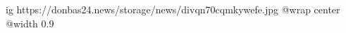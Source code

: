  
 
 
 
 

\ifcmt
  ig https://donbas24.news/storage/news/divqn70cqmkywefe.jpg
  @wrap center
  @width 0.9
\fi
